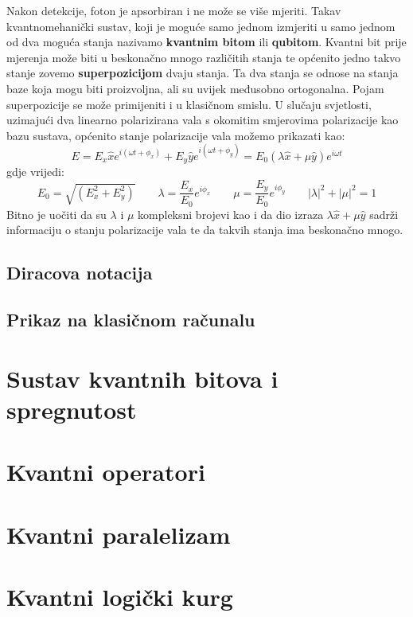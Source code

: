 Nakon detekcije, foton je apsorbiran i ne može se više mjeriti. Takav kvantnomehanički sustav, koji je moguće samo jednom izmjeriti u samo jednom od dva moguća stanja nazivamo \textbf{kvantnim bitom} ili \textbf{qubitom}.
Kvantni bit prije mjerenja može biti u beskonačno mnogo različitih stanja te općenito jedno takvo stanje zovemo \textbf{superpozicijom} dvaju stanja. Ta dva stanja se odnose na stanja baze koja mogu biti proizvoljna, ali su uvijek međusobno ortogonalna. Pojam superpozicije se može primijeniti i u klasičnom smislu. U slučaju svjetlosti, uzimajući dva linearno polarizirana vala s okomitim smjerovima polarizacije kao bazu sustava, općenito stanje polarizacije vala možemo prikazati kao:
\begin{equation}
E = E_x \hat{x}e^{i(\omega t + \phi_x)} + E_y \hat{y}e^{i(\omega t + \phi_y)} = E_0(\lambda \hat{x} + \mu \hat{y})e^{i\omega t}
\end{equation}
gdje vrijedi:
\begin{equation}
E_0 = \sqrt{(E_x^2 + E_y^2)}
\qquad
\lambda = \frac{E_x}{E_0}e^{i\phi_x}
\qquad
\mu = \frac{E_y}{E_0}e^{i\phi_y}
\qquad
|\lambda|^2 + |\mu|^2 = 1
\end{equation}
Bitno je uočiti da su $\lambda$ i $\mu$ kompleksni brojevi kao i da dio izraza $\lambda\hat{x}+\mu\hat{y}$ sadrži informaciju o stanju polarizacije vala te da takvih stanja ima beskonačno mnogo.

\subsection{Diracova notacija}


\subsection{Prikaz na klasičnom računalu}










\section{Sustav kvantnih bitova i spregnutost}

\section{Kvantni operatori}

\section{Kvantni paralelizam}

\section{Kvantni logički kurg}